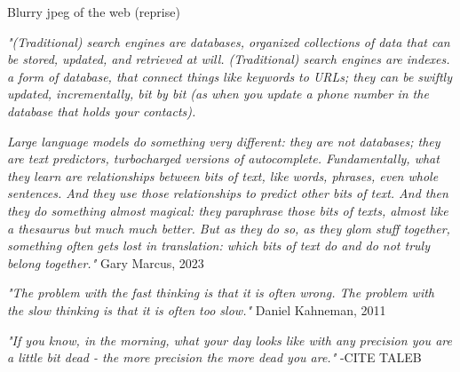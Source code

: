 Blurry jpeg of the web (reprise)

\textit{"(Traditional) search engines are databases, organized collections of data that can be stored, updated, and retrieved at will. (Traditional) search engines are indexes. a form of database, that connect things like keywords to URLs; they can be swiftly updated, incrementally, bit by bit (as when you update a phone number in the database that holds your contacts).}

\textit{Large language models do something very different: they are not databases; they are text predictors, turbocharged versions of autocomplete. Fundamentally, what they learn are relationships between bits of text, like words, phrases, even whole sentences. And they use those relationships to predict other bits of text. And then they do something almost magical: they paraphrase those bits of texts, almost like a thesaurus but much much better. But as they do so, as they glom stuff together, something often gets lost in translation: which bits of text do and do not truly belong together."} Gary Marcus, 2023 \cite{marcus2023}

\textit{"The problem with the fast thinking is that it is often wrong. The problem with the slow thinking is that it is often too slow."} Daniel Kahneman, 2011 \cite{Kahneman2011}

\textit{"If you know, in the morning, what your day looks like with any precision you are a little bit dead - the more precision the more dead you are."} -CITE TALEB

